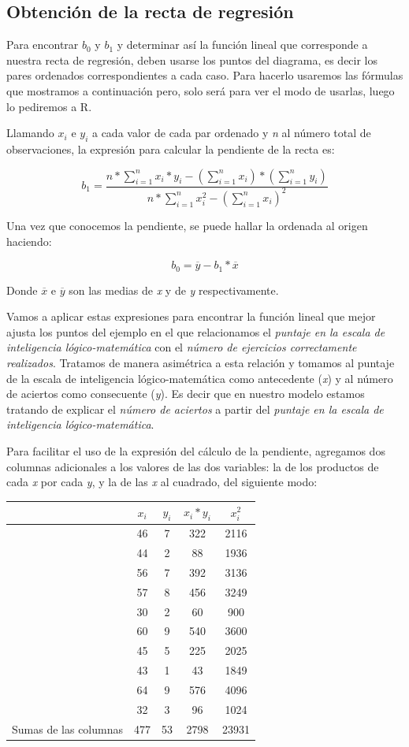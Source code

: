 \documentclass[]{book}
\begin{document}
\hypertarget{obtenciuxf3n-de-la-recta-de-regresiuxf3n}{%
\subsection{Obtención de la recta de regresión}\label{obtenciuxf3n-de-la-recta-de-regresiuxf3n}}

Para encontrar \(b_{0}\) y \(b_{1}\) y determinar así la función lineal que
corresponde a nuestra recta de regresión, deben usarse los puntos del
diagrama, es decir los pares ordenados correspondientes a cada caso.
Para hacerlo usaremos las fórmulas que mostramos a continuación pero,
solo será para ver el modo de usarlas, luego lo pediremos a R.

Llamando \(x_i\) e \(y_i\) a cada valor de cada par ordenado y
\emph{n} al número total de observaciones, la expresión para calcular la
pendiente de la recta es:

\[b_1=\frac{n*\sum_{i=1}^{n}{x_i*y_i}-(\sum_{i=1}^{n}x_i)*(\sum_{i=1}^{n}y_i)}{n*\sum_{i=1}^{n}x_i^{2}-(\sum_{i=1}^{n}x_i )^{2}}\]

Una vez que conocemos la pendiente, se puede hallar la ordenada al
origen haciendo:

\[b_{0} = \overline{y} - b_{1}*\overline{x}\]

Donde \(\overline{x}\) e \(\overline{y}\) son las medias de \emph{x} y de \emph{y}
respectivamente.

Vamos a aplicar estas expresiones para encontrar la función lineal que mejor ajusta los puntos del ejemplo en el que relacionamos el \emph{puntaje en la escala de inteligencia lógico-matemática} con el \emph{número de ejercicios correctamente realizados}. Tratamos de manera asimétrica a esta relación y tomamos al puntaje de la escala de inteligencia lógico-matemática como antecedente (\emph{x}) y al número de aciertos como consecuente (\emph{y}). Es decir que en nuestro modelo estamos tratando de explicar el \emph{número de aciertos} a partir del \emph{puntaje en la escala de inteligencia lógico-matemática}.

Para facilitar el uso de la expresión del cálculo de la pendiente,
agregamos dos columnas adicionales a los valores de las dos variables: la de los productos de cada \emph{x} por cada \emph{y}, y la de las \emph{x} al cuadrado, del siguiente modo:

\begin{longtable}[]{@{}lcccc@{}}
\toprule
& \(x_i\) & \(y_i\) & \(x_i*y_i\) & \(x_i^2\)\tabularnewline
\midrule
\endhead
& 46 & 7 & 322 & 2116\tabularnewline
& 44 & 2 & 88 & 1936\tabularnewline
& 56 & 7 & 392 & 3136\tabularnewline
& 57 & 8 & 456 & 3249\tabularnewline
& 30 & 2 & 60 & 900\tabularnewline
& 60 & 9 & 540 & 3600\tabularnewline
& 45 & 5 & 225 & 2025\tabularnewline
& 43 & 1 & 43 & 1849\tabularnewline
& 64 & 9 & 576 & 4096\tabularnewline
& 32 & 3 & 96 & 1024\tabularnewline
Sumas de las columnas & 477 & 53 & 2798 & 23931\tabularnewline
\bottomrule
\end{longtable}
\end{document}
